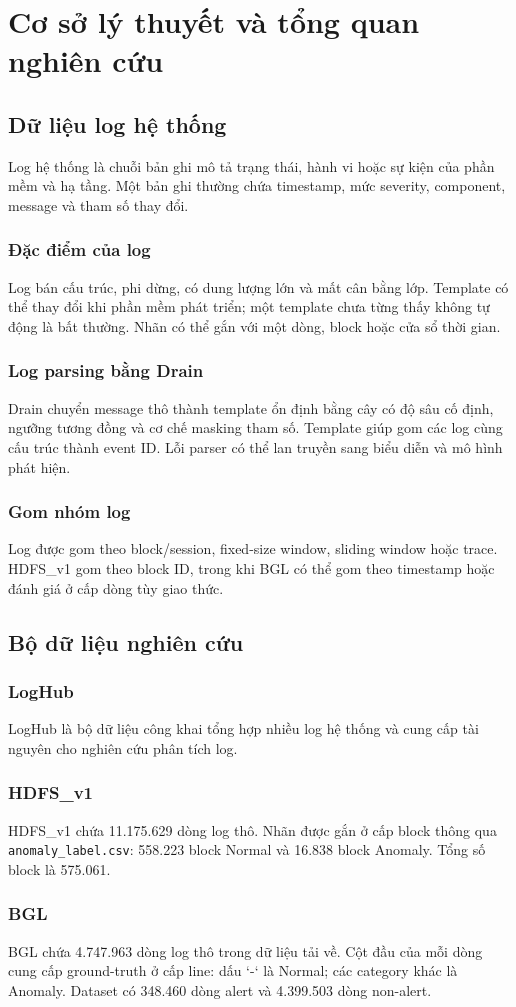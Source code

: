 \chapter{Cơ sở lý thuyết và tổng quan nghiên cứu}

\section{Dữ liệu log hệ thống}
Log hệ thống là chuỗi bản ghi mô tả trạng thái, hành vi hoặc sự kiện của phần
mềm và hạ tầng. Một bản ghi thường chứa timestamp, mức severity, component,
message và tham số thay đổi.

\subsection{Đặc điểm của log}
Log bán cấu trúc, phi dừng, có dung lượng lớn và mất cân bằng lớp. Template có
thể thay đổi khi phần mềm phát triển; một template chưa từng thấy không tự động
là bất thường. Nhãn có thể gắn với một dòng, block hoặc cửa sổ thời gian.

\subsection{Log parsing bằng Drain}
Drain chuyển message thô thành template ổn định bằng cây có độ sâu cố định,
ngưỡng tương đồng và cơ chế masking tham số. Template giúp gom các log cùng cấu
trúc thành event ID. Lỗi parser có thể lan truyền sang biểu diễn và mô hình
phát hiện.

\subsection{Gom nhóm log}
Log được gom theo block/session, fixed-size window, sliding window hoặc trace.
HDFS\_v1 gom theo block ID, trong khi BGL có thể gom theo timestamp hoặc đánh
giá ở cấp dòng tùy giao thức.

\section{Bộ dữ liệu nghiên cứu}
\subsection{LogHub}
LogHub là bộ dữ liệu công khai tổng hợp nhiều log hệ thống và cung cấp tài
nguyên cho nghiên cứu phân tích log.

\subsection{HDFS\_v1}
HDFS\_v1 chứa 11.175.629 dòng log thô. Nhãn được gắn ở cấp block thông qua
\texttt{anomaly\_label.csv}: 558.223 block Normal và 16.838 block Anomaly.
Tổng số block là 575.061.

\subsection{BGL}
BGL chứa 4.747.963 dòng log thô trong dữ liệu tải về. Cột đầu của mỗi dòng
cung cấp ground-truth ở cấp line: dấu `-` là Normal; các category khác là
Anomaly. Dataset có 348.460 dòng alert và 4.399.503 dòng non-alert.
